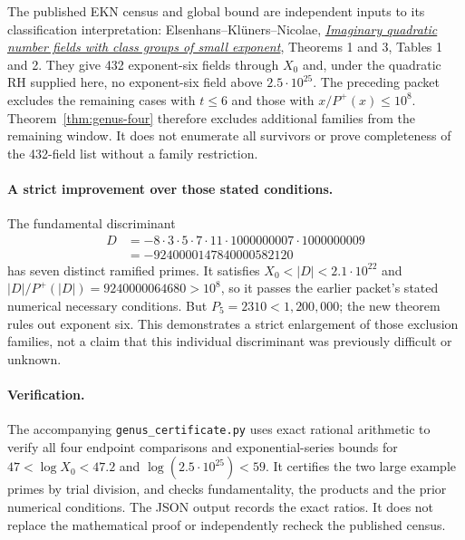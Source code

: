 The published EKN census and global bound are independent inputs to its
classification interpretation: Elsenhans--Kl\"uners--Nicolae,
\href{https://arxiv.org/pdf/1803.02056}{\emph{Imaginary quadratic number
fields with class groups of small exponent}}, Theorems 1 and 3,
Tables 1 and 2. They give 432 exponent-six fields through $X_0$ and,
under the quadratic RH supplied here, no exponent-six field above
$2.5\cdot10^{25}$. The preceding packet excludes the remaining cases
with $t\le6$ and those with $x/P^+(x)\le10^8$.
Theorem~\ref{thm:genus-four} therefore excludes additional families
from the remaining window. It does not enumerate all survivors or prove
completeness of the 432-field list without a family restriction.

\paragraph{A strict improvement over those stated conditions.}
The fundamental discriminant
\[
\begin{split}
D&=-8\cdot3\cdot5\cdot7\cdot11\cdot1000000007\cdot1000000009\\
 &=-9240000147840000582120
\end{split}
\]
has seven distinct ramified primes. It satisfies
$X_0<|D|<2.1\cdot10^{22}$ and
$|D|/P^+(|D|)=9240000064680>10^8$, so it passes the earlier packet's
stated numerical necessary conditions. But $P_5=2310<1{,}200{,}000$;
the new theorem rules out exponent six. This demonstrates a strict
enlargement of those exclusion families, not a claim that this individual
discriminant was previously difficult or unknown.

\paragraph{Verification.}
The accompanying \texttt{genus\_certificate.py} uses exact rational
arithmetic to verify all four endpoint comparisons and exponential-series
bounds for $47<\log X_0<47.2$ and $\log(2.5\cdot10^{25})<59$.
It certifies the two large example primes by trial division, and checks
fundamentality, the products and the prior numerical conditions.
The JSON output records the exact ratios. It does not replace the
mathematical proof or independently recheck the published census.
